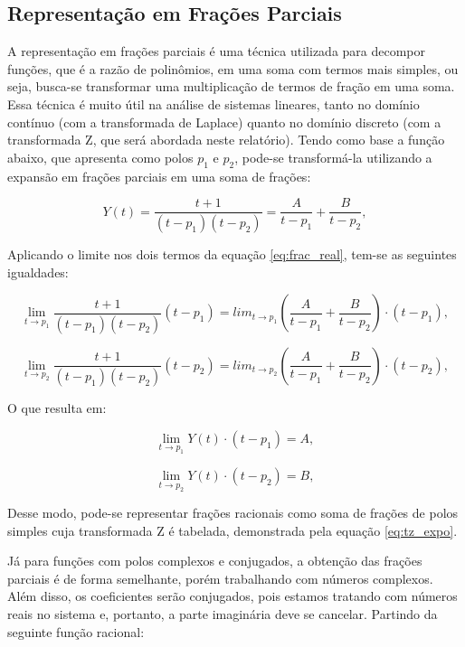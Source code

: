 \subsection{Representação em Frações Parciais}

A representação em frações parciais é uma técnica utilizada para decompor funções, que é a razão de polinômios, em uma soma com termos mais simples, ou seja, busca-se transformar uma multiplicação de termos de fração em uma soma. Essa técnica é muito útil na análise de sistemas lineares, tanto no domínio contínuo (com a transformada de Laplace) quanto no domínio discreto (com a transformada Z, que será abordada neste relatório). Tendo como base a função abaixo, que apresenta como polos \( p_1 \) e \( p_2 \), pode-se transformá-la utilizando a expansão em frações parciais em uma soma de frações:

\begin{equation}
Y(t)=\frac{t+1}{(t-p_1)(t-p_2)} = \frac{A}{t-p_1} + \frac{B}{t-p_2},
\label{eq:frac_real}
\end{equation}

Aplicando o limite nos dois termos da equação \ref{eq:frac_real}, tem-se as seguintes igualdades:

\begin{equation}
    \lim_{t \to p_1}\frac{t+1}{(t-p_1)(t-p_2)} (t-p_1)= lim_{t \to p_1} \left(\frac{A}{t-p_1} + \frac{B}{t-p_2}\right) \cdot(t - p_1),
\end{equation}

\begin{equation}
    \lim_{t \to p_2}\frac{t+1}{(t-p_1)(t-p_2)} (t-p_2)= lim_{t \to p_2} \left(\frac{A}{t-p_1} + \frac{B}{t-p_2}\right) \cdot(t - p_2),
\end{equation}

O que resulta em: 

\begin{equation}
\lim_{t \to p_1} Y(t) \cdot (t - p_1) = A,
\label{eq:lim_real_1}
\end{equation}

\begin{equation}
\lim_{t \to p_2} Y(t) \cdot (t - p_2) = B,
\label{eq:lim_real_2}
\end{equation}

Desse modo, pode-se representar frações racionais como soma de frações de polos simples cuja transformada Z é tabelada, demonstrada pela equação \ref{eq:tz_expo}.

Já para funções com polos complexos e conjugados, a obtenção das frações parciais é de forma semelhante, porém trabalhando com números complexos. Além disso, os coeficientes serão conjugados, pois estamos tratando com números reais no sistema e, portanto, a parte imaginária deve se cancelar. Partindo da seguinte função racional:

